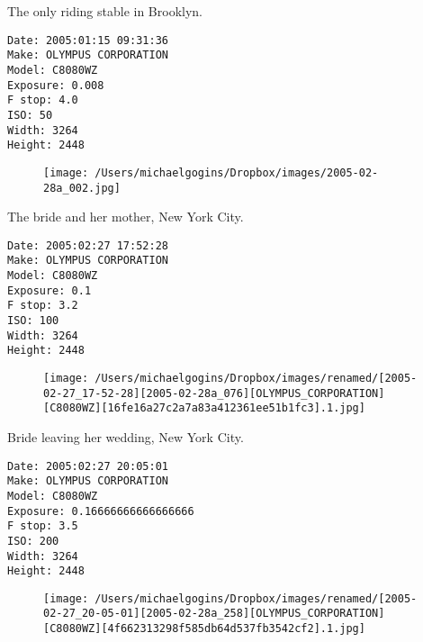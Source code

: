 \documentclass[11pt,letter,DIV=14,paper=landscape]{scrbook}
\begin{document}
\clearpage
\noindent The only riding stable in Brooklyn.
\noindent
\begin{lstlisting}
Date: 2005:01:15 09:31:36
Make: OLYMPUS CORPORATION
Model: C8080WZ
Exposure: 0.008
F stop: 4.0
ISO: 50
Width: 3264
Height: 2448
\end{lstlisting}
\clearpage

\begin{figure}
\texttt{[image: /Users/michaelgogins/Dropbox/images/2005-02-28a\_002.jpg]}
\end{figure}
    
\clearpage
\noindent The bride and her mother, New York City.
\noindent
\begin{lstlisting}
Date: 2005:02:27 17:52:28
Make: OLYMPUS CORPORATION
Model: C8080WZ
Exposure: 0.1
F stop: 3.2
ISO: 100
Width: 3264
Height: 2448
\end{lstlisting}
\clearpage

\begin{figure}
\texttt{[image: /Users/michaelgogins/Dropbox/images/renamed/[2005-02-27\_17-52-28][2005-02-28a\_076][OLYMPUS\_CORPORATION][C8080WZ][16fe16a27c2a7a83a412361ee51b1fc3].1.jpg]}
\end{figure}
    
\clearpage
\noindent Bride leaving her wedding, New York City.
\noindent
\begin{lstlisting}
Date: 2005:02:27 20:05:01
Make: OLYMPUS CORPORATION
Model: C8080WZ
Exposure: 0.16666666666666666
F stop: 3.5
ISO: 200
Width: 3264
Height: 2448
\end{lstlisting}
\clearpage

\begin{figure}
\texttt{[image: /Users/michaelgogins/Dropbox/images/renamed/[2005-02-27\_20-05-01][2005-02-28a\_258][OLYMPUS\_CORPORATION][C8080WZ][4f662313298f585db64d537fb3542cf2].1.jpg]}
\end{figure}
    
\end{document}
